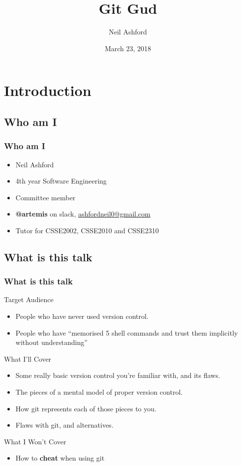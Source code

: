 \documentclass{beamer}
\title{Git Gud}
\author{Neil Ashford}
\institute{UQ Computing Society}
\date{March 23, 2018}
\begin{document}
\begin{frame}
    \titlepage
\end{frame}

\section{Introduction}

\subsection{Who am I}
\begin{frame}
    \frametitle{Who am I}
    \begin{itemize}[<+->]
        \item Neil Ashford
        \item 4th year Software Engineering
        \item Committee member
        \item \textbf{@artemis} on slack, \url{ashfordneil0@gmail.com}
        \item Tutor for CSSE2002, CSSE2010 and CSSE2310
    \end{itemize}
\end{frame}

\subsection{What is this talk}
\begin{frame}
    \frametitle{What is this talk}
    Target Audience
    \pause
    \begin{itemize}[<+->]
        \item People who have never used version control.
        \item People who have ``memorised 5 shell commands and trust them implicitly without understanding''
    \end{itemize}
    \pause
    What I'll Cover
    \begin{itemize}[<+->]
        \item Some really basic version control you're familiar with, and its flaws.
        \item The pieces of a mental model of proper version control.
        \item How git represents each of those pieces to you.
        \item Flaws with git, and alternatives.
    \end{itemize}
    \pause
    What I Won't Cover
    \begin{itemize}[<+->]
        \item How to \textbf{cheat} when using git
    \end{itemize}
\end{frame}
\end{document}
